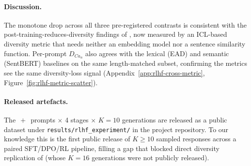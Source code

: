 \paragraph{Discussion.} The monotone drop across all three pre-registered contrasts is consistent with the post-training-reduces-diversity findings of \citet{kirk2023rlhf,padmakumar2023writingreduces}, now measured by an ICL-based diversity metric that needs neither an embedding model nor a sentence similarity function.
Per-prompt $D_{Ca_n}$ also agrees with the lexical (EAD) and semantic (SentBERT) baselines on the same length-matched subset, confirming the metrics see the same diversity-loss signal (Appendix~\ref{app:rlhf-cross-metric}, Figure~\ref{fig:rlhf-metric-scatter}).
\paragraph{Released artefacts.} The \olmoAlpacaN$\,+\,$\olmoNbCuratedN{} prompts $\times$ 4 stages $\times$ $K{=}10$ generations are released as a public dataset under \texttt{results/rlhf\_experiment/} in the project repository.
To our knowledge this is the first public release of $K\!\ge\!10$ sampled responses across a paired SFT/DPO/RL pipeline, filling a gap that blocked direct diversity replication of \citet{kirk2023rlhf} (whose $K{=}16$ generations were not publicly released).

